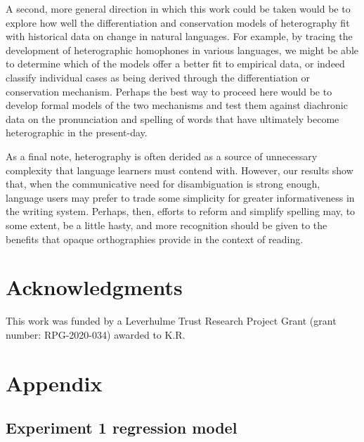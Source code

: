 \documentclass[doc,biblatex]{apa7}
\begin{document}
A second, more general direction in which this work could be taken would be to explore how well the differentiation and conservation models of heterography fit with historical data on change in natural languages. For example, by tracing the development of heterographic homophones in various languages, we might be able to determine which of the models offer a better fit to empirical data, or indeed classify individual cases as being derived through the differentiation or conservation mechanism. Perhaps the best way to proceed here would be to develop formal models of the two mechanisms and test them against diachronic data on the pronunciation and spelling of words that have ultimately become heterographic in the present-day.

As a final note, heterography is often derided as a source of unnecessary complexity that language learners must contend with. However, our results show that, when the communicative need for disambiguation is strong enough, language users may prefer to trade some simplicity for greater informativeness in the writing system. Perhaps, then, efforts to reform and simplify spelling may, to some extent, be a little hasty, and more recognition should be given to the benefits that opaque orthographies provide in the context of reading.


\section{Acknowledgments}

\noindent This work was funded by a Leverhulme Trust Research Project Grant (grant number: RPG-2020-034) awarded to K.R.

\printbibliography


\clearpage

\section{Appendix}

\subsection{Experiment 1 regression model}
\end{document}
